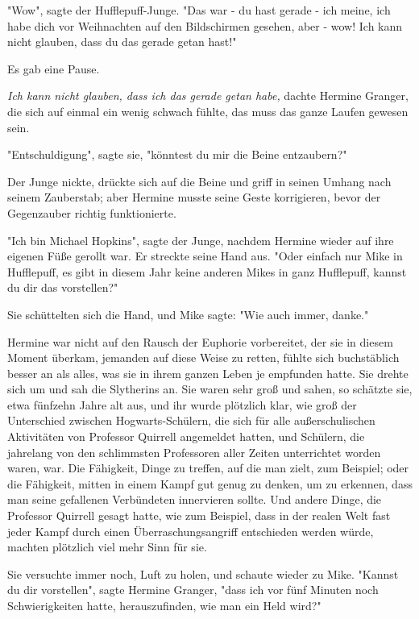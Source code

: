 {"Wow", sagte der Hufflepuff-Junge. "Das war - du hast gerade - ich meine, ich habe dich vor Weihnachten auf den Bildschirmen gesehen, aber - wow! Ich kann nicht glauben, dass du das gerade getan hast!"

Es gab eine Pause.

\emph{Ich kann nicht glauben, dass ich das gerade getan habe,} dachte Hermine Granger, die sich auf einmal ein wenig schwach fühlte, das muss das ganze Laufen gewesen sein.

"Entschuldigung", sagte sie, "könntest du mir die Beine entzaubern?"

Der Junge nickte, drückte sich auf die Beine und griff in seinen Umhang nach seinem Zauberstab; aber Hermine musste seine Geste korrigieren, bevor der Gegenzauber richtig funktionierte.

"Ich bin Michael Hopkins", sagte der Junge, nachdem Hermine wieder auf ihre eigenen Füße gerollt war. Er streckte seine Hand aus. "Oder einfach nur Mike in Hufflepuff, es gibt in diesem Jahr keine anderen Mikes in ganz Hufflepuff, kannst du dir das vorstellen?"

Sie schüttelten sich die Hand, und Mike sagte: "Wie auch immer, danke."

Hermine war nicht auf den Rausch der Euphorie vorbereitet, der sie in diesem Moment überkam, jemanden auf diese Weise zu retten, fühlte sich buchstäblich besser an als alles, was sie in ihrem ganzen Leben je empfunden hatte. Sie drehte sich um und sah die Slytherins an. Sie waren sehr groß und sahen, so schätzte sie, etwa fünfzehn Jahre alt aus, und ihr wurde plötzlich klar, wie groß der Unterschied zwischen Hogwarts-Schülern, die sich für alle außerschulischen Aktivitäten von Professor Quirrell angemeldet hatten, und Schülern, die jahrelang von den schlimmsten Professoren aller Zeiten unterrichtet worden waren, war. Die Fähigkeit, Dinge zu treffen, auf die man zielt, zum Beispiel; oder die Fähigkeit, mitten in einem Kampf gut genug zu denken, um zu erkennen, dass man seine gefallenen Verbündeten innervieren sollte. Und andere Dinge, die Professor Quirrell gesagt hatte, wie zum Beispiel, dass in der realen Welt fast jeder Kampf durch einen Überraschungsangriff entschieden werden würde, machten plötzlich viel mehr Sinn für sie.

Sie versuchte immer noch, Luft zu holen, und schaute wieder zu Mike. "Kannst du dir vorstellen", sagte Hermine Granger, "dass ich vor fünf Minuten noch Schwierigkeiten hatte, herauszufinden, wie man ein Held wird?"

}

